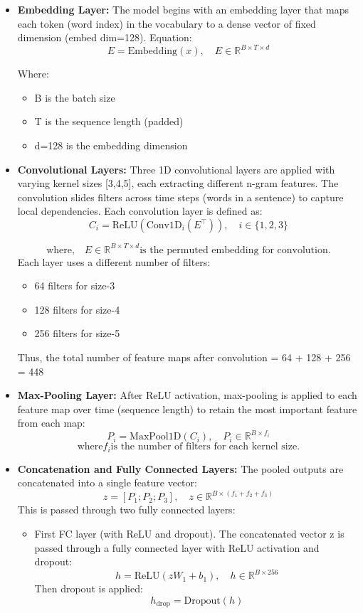 \documentclass{article}
\begin{document}
\begin{itemize}
\item \textbf{Embedding Layer:} The model begins with an embedding layer that maps each token (word index) in the vocabulary to a dense vector of fixed dimension (embed dim=128). Equation:
\[
E = \text{Embedding}(x), \quad E \in \mathbb{R}^{B \times T \times d}
\]

Where:
\begin{itemize}
\item B is the batch size
\item T is the sequence length (padded)
\item d=128 is the embedding dimension
\end{itemize}

\item \textbf{Convolutional Layers:} Three 1D convolutional layers are applied with varying kernel sizes [3,4,5], each extracting different n-gram features. The convolution slides filters across time steps (words in a sentence) to capture local dependencies. Each convolution layer is defined as:
\[
C_i = \text{ReLU}(\text{Conv1D}_i(E^\top)), \quad i \in \{1, 2, 3\}
\]

\[\text{where,} \quad E \in \mathbb{R}^{B \times T \times d}  \text{is the permuted embedding for convolution.}\]
Each layer uses a different number of filters:
\begin{itemize}
\item 64 filters for size-3
\item 128 filters for size-4
\item 256 filters for size-5
\end{itemize}
Thus, the total number of feature maps after convolution = 64 + 128 + 256 = 448

\item \textbf{Max-Pooling Layer:} After ReLU activation, max-pooling is applied to each feature map over time (sequence length) to retain the most important feature from each map:
\[
P_i = \text{MaxPool1D}(C_i), \quad P_i \in \mathbb{R}^{B \times f_i}
\]
\[\text{where}  {f_i} \text{is the number of filters for each kernel size.}\] 

\item \textbf{Concatenation and Fully Connected Layers:} The pooled outputs are concatenated into a single feature vector:
\[
z = [P_1; P_2; P_3], \quad z \in \mathbb{R}^{B \times (f_1 + f_2 + f_3)}
\]
This is passed through two fully connected layers:
\begin{itemize}
\item First FC layer (with ReLU and dropout).
The concatenated vector z is passed through a fully connected layer with ReLU activation and dropout:
\[
h = \text{ReLU}(zW_1 + b_1), \quad h \in \mathbb{R}^{B \times 256}
\]
Then dropout is applied:
\[
h_{\text{drop}} = \text{Dropout}(h)
\]


\end{itemize}
\end{itemize}
\end{document}
